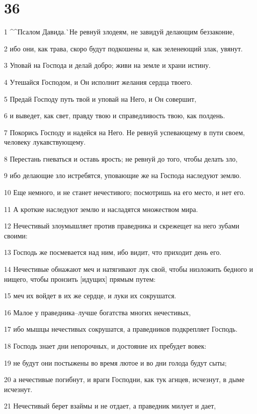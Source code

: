 \chapter{36}

\par 1 ^^Псалом Давида.^^ Не ревнуй злодеям, не завидуй делающим беззаконие,
\par 2 ибо они, как трава, скоро будут подкошены и, как зеленеющий злак, увянут.
\par 3 Уповай на Господа и делай добро; живи на земле и храни истину.
\par 4 Утешайся Господом, и Он исполнит желания сердца твоего.
\par 5 Предай Господу путь твой и уповай на Него, и Он совершит,
\par 6 и выведет, как свет, правду твою и справедливость твою, как полдень.
\par 7 Покорись Господу и надейся на Него. Не ревнуй успевающему в пути своем, человеку лукавствующему.
\par 8 Перестань гневаться и оставь ярость; не ревнуй до того, чтобы делать зло,
\par 9 ибо делающие зло истребятся, уповающие же на Господа наследуют землю.
\par 10 Еще немного, и не станет нечестивого; посмотришь на его место, и нет его.
\par 11 А кроткие наследуют землю и насладятся множеством мира.
\par 12 Нечестивый злоумышляет против праведника и скрежещет на него зубами своими:
\par 13 Господь же посмевается над ним, ибо видит, что приходит день его.
\par 14 Нечестивые обнажают меч и натягивают лук свой, чтобы низложить бедного и нищего, чтобы пронзить [идущих] прямым путем:
\par 15 меч их войдет в их же сердце, и луки их сокрушатся.
\par 16 Малое у праведника--лучше богатства многих нечестивых,
\par 17 ибо мышцы нечестивых сокрушатся, а праведников подкрепляет Господь.
\par 18 Господь знает дни непорочных, и достояние их пребудет вовек:
\par 19 не будут они постыжены во время лютое и во дни голода будут сыты;
\par 20 а нечестивые погибнут, и враги Господни, как тук агнцев, исчезнут, в дыме исчезнут.
\par 21 Нечестивый берет взаймы и не отдает, а праведник милует и дает,
